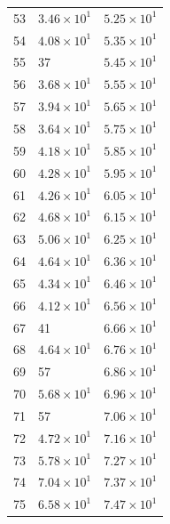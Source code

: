\begin{table}[H]
\begin{tabular}{lll}
53 & $\displaystyle 3.46 \times 10^{1}$ & $\displaystyle 5.25 \times 10^{1}$ \\
54 & $\displaystyle 4.08 \times 10^{1}$ & $\displaystyle 5.35 \times 10^{1}$ \\
55 & 37 & $\displaystyle 5.45 \times 10^{1}$ \\
56 & $\displaystyle 3.68 \times 10^{1}$ & $\displaystyle 5.55 \times 10^{1}$ \\
57 & $\displaystyle 3.94 \times 10^{1}$ & $\displaystyle 5.65 \times 10^{1}$ \\
58 & $\displaystyle 3.64 \times 10^{1}$ & $\displaystyle 5.75 \times 10^{1}$ \\
59 & $\displaystyle 4.18 \times 10^{1}$ & $\displaystyle 5.85 \times 10^{1}$ \\
60 & $\displaystyle 4.28 \times 10^{1}$ & $\displaystyle 5.95 \times 10^{1}$ \\
61 & $\displaystyle 4.26 \times 10^{1}$ & $\displaystyle 6.05 \times 10^{1}$ \\
62 & $\displaystyle 4.68 \times 10^{1}$ & $\displaystyle 6.15 \times 10^{1}$ \\
63 & $\displaystyle 5.06 \times 10^{1}$ & $\displaystyle 6.25 \times 10^{1}$ \\
64 & $\displaystyle 4.64 \times 10^{1}$ & $\displaystyle 6.36 \times 10^{1}$ \\
65 & $\displaystyle 4.34 \times 10^{1}$ & $\displaystyle 6.46 \times 10^{1}$ \\
66 & $\displaystyle 4.12 \times 10^{1}$ & $\displaystyle 6.56 \times 10^{1}$ \\
67 & 41 & $\displaystyle 6.66 \times 10^{1}$ \\
68 & $\displaystyle 4.64 \times 10^{1}$ & $\displaystyle 6.76 \times 10^{1}$ \\
69 & 57 & $\displaystyle 6.86 \times 10^{1}$ \\
70 & $\displaystyle 5.68 \times 10^{1}$ & $\displaystyle 6.96 \times 10^{1}$ \\
71 & 57 & $\displaystyle 7.06 \times 10^{1}$ \\
72 & $\displaystyle 4.72 \times 10^{1}$ & $\displaystyle 7.16 \times 10^{1}$ \\
73 & $\displaystyle 5.78 \times 10^{1}$ & $\displaystyle 7.27 \times 10^{1}$ \\
74 & $\displaystyle 7.04 \times 10^{1}$ & $\displaystyle 7.37 \times 10^{1}$ \\
75 & $\displaystyle 6.58 \times 10^{1}$ & $\displaystyle 7.47 \times 10^{1}$ \\

\end{tabular}
\end{table}
